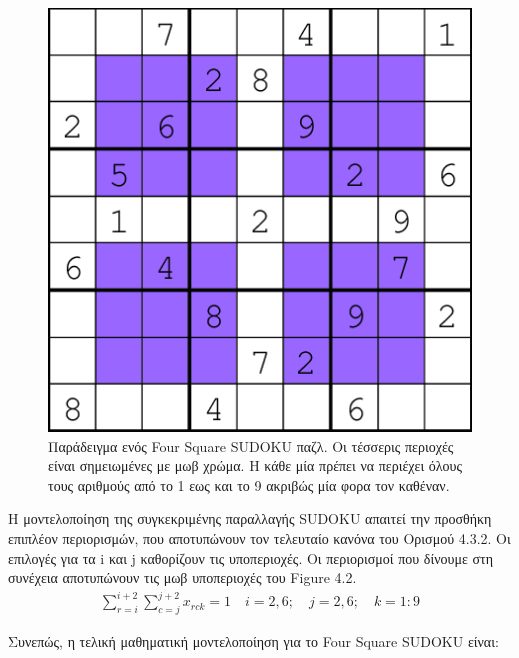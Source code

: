 \documentclass[12pt]{book}
\theoremstyle{definition}
\begin{document}
\begin{figure}[h]
	\centering
	\includegraphics[scale=0.7]{Figures/An-example-Four-Square-Sudoku-puzzle.png}
	\caption{Παράδειγμα ενός Four Square SUDOKU παζλ. Οι τέσσερις περιοχές είναι σημειωμένες με μωβ χρώμα. Η κάθε μία πρέπει να περιέχει όλους τους αριθμούς από το 1 εως και το 9 ακριβώς μία φορα τον καθέναν.}
\end{figure}

Η μοντελοποίηση της συγκεκριμένης παραλλαγής SUDOKU απαιτεί την προσθήκη επιπλέον περιορισμών, που αποτυπώνουν τον τελευταίο κανόνα του Ορισμού 4.3.2. Οι επιλογές για τα i και j καθορίζουν τις υποπεριοχές. Οι περιορισμοί που δίνουμε στη συνέχεια αποτυπώνουν τις μωβ υποπεριοχές του Figure 4.2.\\

\begin{align*}
	\sum_{r=i}^{i+2}{\sum_{c=j}^{j+2}x_{rck}} = 1 \quad i=2,6; \quad j=2,6; \quad k=1:9
\end{align*}

Συνεπώς, η τελική μαθηματική μοντελοποίηση για το Four Square SUDOKU είναι:
\end{document}
